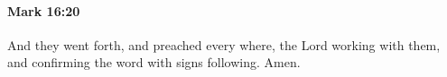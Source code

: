 		\paragraph{Mark 16:20} %
			\label{MARK-16-20}

			And they went forth, and preached every where, the Lord working with them, and confirming the word with signs following. Amen.

			\begin{framed}
			\scriptsize
				\begin{compactdesc}
					\item[SBLG] 
				\end{compactdesc}
			\end{framed}